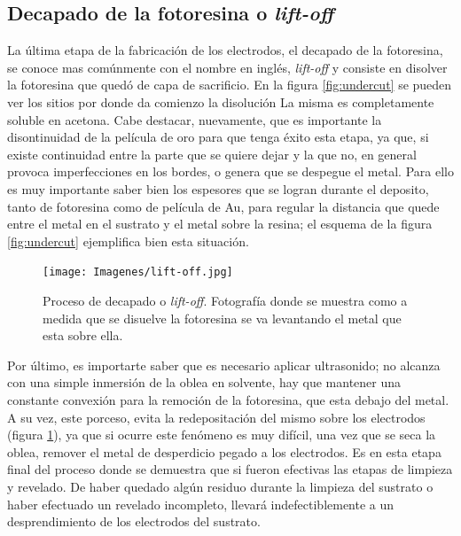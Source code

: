   		\subsection{Decapado de la fotoresina o\textit{ lift-off}}


		 La última etapa de la fabricación de los electrodos, el decapado de la fotoresina, se conoce mas comúnmente con el nombre en inglés, \textit{lift-off} y consiste en disolver la fotoresina que quedó de capa de sacrificio. En la figura \ref{fig:undercut} se pueden ver los sitios por donde da comienzo la disolución La misma es completamente soluble en acetona. Cabe destacar, nuevamente, que es importante la disontinuidad de la película de oro para que tenga éxito esta etapa, ya que, si existe continuidad entre la parte que se quiere dejar y la que no, en general provoca imperfecciones en los bordes, o genera que se despegue el metal. Para ello es muy importante saber bien los espesores que se logran durante el deposito, tanto de fotoresina como de película de Au, para regular la distancia que quede entre el metal en el sustrato y el metal sobre la resina; el esquema de la figura \ref{fig:undercut} ejemplifica bien esta situación.

					  \begin{figure}[ht!]
					  \begin{center}
					  \texttt{[image: Imagenes/lift-off.jpg]}
					  \caption[Proceso de decapado o\textit{ lift-off}]{Proceso de decapado o\textit{ lift-off}. Fotografía donde se muestra como a medida que se disuelve la fotoresina se va levantando el metal que esta sobre ella.}
					  \label{fig:ultrasonido}
					  \end{center}
					  \end{figure}

		 Por último, es importarte saber que es necesario aplicar ultrasonido; no alcanza con una simple inmersión de la oblea en solvente, hay que mantener una constante convexión para la remoción de la fotoresina, que esta debajo del metal. A su vez, este porceso, evita la redepositación del mismo sobre los electrodos (figura \ref{fig:ultrasonido}), ya que si ocurre este fenómeno es muy difícil, una vez que se seca la oblea, remover el metal de desperdicio pegado a los electrodos. Es en esta etapa final del proceso donde se demuestra que si fueron efectivas las etapas de limpieza y revelado. De haber quedado algún residuo durante la limpieza del sustrato o haber efectuado un revelado incompleto, llevará indefectiblemente a un desprendimiento de los electrodos del sustrato.

